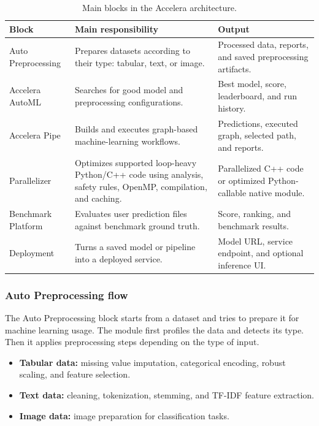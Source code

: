 \documentclass[12pt,a4paper]{report}
\newcommand{\acceleraTableStyle}{%
\small
\renewcommand{\arraystretch}{1.15}
\setlength{\tabcolsep}{4pt}%
}
\begin{document}
\begin{table}[H]
\centering
\acceleraTableStyle
\caption{Main blocks in the Accelera architecture.}
\label{tab:block-diagram-modules}
\begin{tabularx}{\textwidth}{p{}X X}
\toprule
\textbf{Block} & \textbf{Main responsibility} & \textbf{Output} \\
\midrule

Auto Preprocessing &
Prepares datasets according to their type: tabular, text, or image. &
Processed data, reports, and saved preprocessing artifacts. \\
\midrule

Accelera AutoML &
Searches for good model and preprocessing configurations. &
Best model, score, leaderboard, and run history. \\
\midrule

Accelera Pipe &
Builds and executes graph-based machine-learning workflows. &
Predictions, executed graph, selected path, and reports. \\
\midrule

Parallelizer &
Optimizes supported loop-heavy Python/C++ code using analysis, safety rules,
OpenMP, compilation, and caching. &
Parallelized C++ code or optimized Python-callable native module. \\
\midrule

Benchmark Platform &
Evaluates user prediction files against benchmark ground truth. &
Score, ranking, and benchmark results. \\
\midrule

Deployment &
Turns a saved model or pipeline into a deployed service. &
Model URL, service endpoint, and optional inference UI. \\

\bottomrule
\end{tabularx}
\end{table}

\subsubsection*{Auto Preprocessing flow}

The Auto Preprocessing block starts from a dataset and tries to prepare it for
machine learning usage. The module first profiles the data and detects its type.
Then it applies preprocessing steps depending on the type of input.

\begin{itemize}
  \item \textbf{Tabular data:} missing value imputation, categorical encoding,
  robust scaling, and feature selection.
  \item \textbf{Text data:} cleaning, tokenization, stemming, and TF-IDF feature
  extraction.
  \item \textbf{Image data:} image preparation for classification tasks.
\end{itemize}
\end{document}
